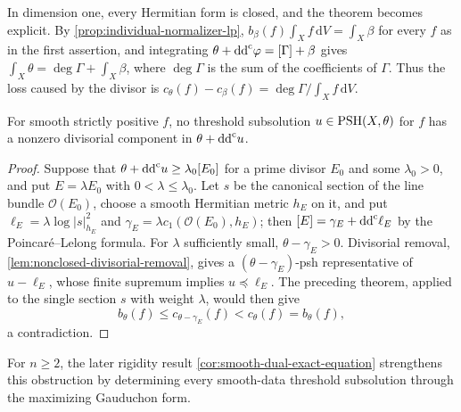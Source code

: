 In dimension one, every Hermitian form is closed, and the theorem becomes explicit. By \cref{prop:individual-normalizer-lp}, $b_\beta(f)\int_Xf\,\mathrm dV=\int_X\beta$ for every $f$ as in the first assertion, and integrating $\theta+\mathrm{dd}^{\mathrm{c}}\varphi=[\Gamma]+\beta$ gives $\int_X\theta=\deg\Gamma+\int_X\beta$, where $\deg\Gamma$ is the sum of the coefficients of $\Gamma$. Thus the loss caused by the divisor is $c_\theta(f)-c_\beta(f)=\deg\Gamma/\int_Xf\,\mathrm dV$.

\begin{corollary}\label{cor:critical-no-divisor}
For smooth strictly positive $f$, no threshold subsolution $u\in\mathrm{PSH}(X,\theta)$ for $f$ has a nonzero divisorial component in $\theta+\mathrm{dd}^{\mathrm{c}} u$.
\end{corollary}
\begin{proof}
Suppose that $\theta+\mathrm{dd}^{\mathrm{c}} u\ge\lambda_0[E_0]$ for a prime divisor $E_0$ and some $\lambda_0>0$, and put $E=\lambda E_0$ with $0<\lambda\le\lambda_0$. Let $s$ be the canonical section of the line bundle $\mathcal O(E_0)$, choose a smooth Hermitian metric $h_E$ on it, and put $\ell_E=\lambda\log|s|_{h_E}^2$ and $\gamma_E=\lambda c_1(\mathcal O(E_0),h_E)$; then $[E]=\gamma_E+\mathrm{dd}^{\mathrm{c}}\ell_E$ by the Poincar\'e--Lelong formula. For $\lambda$ sufficiently small, $\theta-\gamma_E>0$. Divisorial removal, \cref{lem:nonclosed-divisorial-removal}, gives a $(\theta-\gamma_E)$-psh representative of $u-\ell_E$, whose finite supremum implies $u\preceq\ell_E$. The preceding theorem, applied to the single section $s$ with weight $\lambda$, would then give
\[
 b_\theta(f)\le c_{\theta-\gamma_E}(f)
                         <c_\theta(f)=b_\theta(f),
\]
a contradiction.
\end{proof}
For $n\geq2$, the later rigidity result \cref{cor:smooth-dual-exact-equation} strengthens this obstruction by determining every smooth-data threshold subsolution through the maximizing Gauduchon form.

